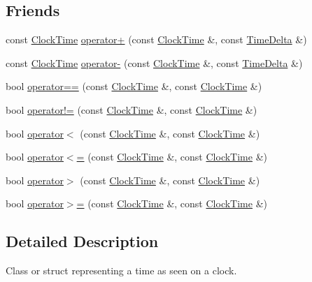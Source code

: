 \subsection*{\-Friends}
\begin{DoxyCompactItemize}
\item 
const \hyperlink{structClockTime}{\-Clock\-Time} \hyperlink{structClockTime_a5931b57cfa225de613d50e5de740794b}{operator+} (const \hyperlink{structClockTime}{\-Clock\-Time} \&, const \hyperlink{structTimeDelta}{\-Time\-Delta} \&)
\item 
const \hyperlink{structClockTime}{\-Clock\-Time} \hyperlink{structClockTime_a5ad78ff449a6926520e1ecc71351f51d}{operator-\/} (const \hyperlink{structClockTime}{\-Clock\-Time} \&, const \hyperlink{structTimeDelta}{\-Time\-Delta} \&)
\item 
bool \hyperlink{structClockTime_a7135b0c2995c1809f4a0cdd9e692ffe5}{operator==} (const \hyperlink{structClockTime}{\-Clock\-Time} \&, const \hyperlink{structClockTime}{\-Clock\-Time} \&)
\item 
bool \hyperlink{structClockTime_ab6293206508b6c5fcc7107c5fa20c0ab}{operator!=} (const \hyperlink{structClockTime}{\-Clock\-Time} \&, const \hyperlink{structClockTime}{\-Clock\-Time} \&)
\item 
bool \hyperlink{structClockTime_a3b391b14edbe6b08f3f615173af8aae1}{operator$<$} (const \hyperlink{structClockTime}{\-Clock\-Time} \&, const \hyperlink{structClockTime}{\-Clock\-Time} \&)
\item 
bool \hyperlink{structClockTime_a220837ade82b091aabc96ab5aa44c168}{operator$<$=} (const \hyperlink{structClockTime}{\-Clock\-Time} \&, const \hyperlink{structClockTime}{\-Clock\-Time} \&)
\item 
bool \hyperlink{structClockTime_a985095ef213439f0aa9644f95b486bda}{operator$>$} (const \hyperlink{structClockTime}{\-Clock\-Time} \&, const \hyperlink{structClockTime}{\-Clock\-Time} \&)
\item 
bool \hyperlink{structClockTime_a329bc543b94a71802572c915efc3656b}{operator$>$=} (const \hyperlink{structClockTime}{\-Clock\-Time} \&, const \hyperlink{structClockTime}{\-Clock\-Time} \&)
\end{DoxyCompactItemize}


\subsection{\-Detailed \-Description}
\-Class or struct representing a time as seen on a clock. 

